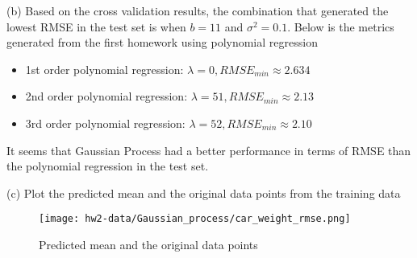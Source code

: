 \documentclass[11pt]{report}
\begin{document}
\justify (b) Based on the cross validation results, the combination that generated the lowest RMSE in the test set is when $b=11$ and $\sigma^2=0.1$. Below is the metrics generated from the first homework using polynomial regression
\begin{itemize}
	\item 1st order polynomial regression: $\lambda = 0, RMSE_{min} \approx 2.634$
	\item 2nd order polynomial regression: $\lambda = 51, RMSE_{min} \approx 2.13$
	\item 3rd order polynomial regression: $\lambda = 52, RMSE_{min} \approx 2.10$
\end{itemize} 

\justify It seems that Gaussian Process had a better performance in terms of RMSE than the polynomial regression in the test set. 


\pagebreak
\justify (c) Plot the predicted mean and the original data points from the training data
\begin{figure}[h]
\texttt{[image: hw2-data/Gaussian\_process/car\_weight\_rmse.png]}
\centering
\caption{Predicted mean and the original data points}
\label{fig:car_weight_rmse}
\end{figure}
\end{document}
